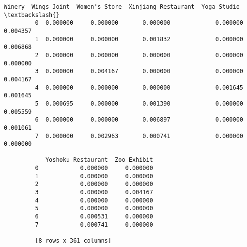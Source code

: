 \documentclass[11pt]{article}
\begin{document}
\begin{Verbatim}[commandchars=\\\{\}]
              Winery  Wings Joint  Women's Store  Xinjiang Restaurant  Yoga Studio  \textbackslash{}
         0  0.000000     0.000000       0.000000             0.000000     0.004357   
         1  0.000000     0.000000       0.001832             0.000000     0.006868   
         2  0.000000     0.000000       0.000000             0.000000     0.000000   
         3  0.000000     0.004167       0.000000             0.000000     0.004167   
         4  0.000000     0.000000       0.000000             0.001645     0.001645   
         5  0.000695     0.000000       0.001390             0.000000     0.005559   
         6  0.000000     0.000000       0.006897             0.000000     0.001061   
         7  0.000000     0.002963       0.000741             0.000000     0.000000   
         
            Yoshoku Restaurant  Zoo Exhibit  
         0            0.000000     0.000000  
         1            0.000000     0.000000  
         2            0.000000     0.000000  
         3            0.000000     0.004167  
         4            0.000000     0.000000  
         5            0.000000     0.000000  
         6            0.000531     0.000000  
         7            0.000741     0.000000  
         
         [8 rows x 361 columns]
\end{Verbatim}
            
\end{document}
